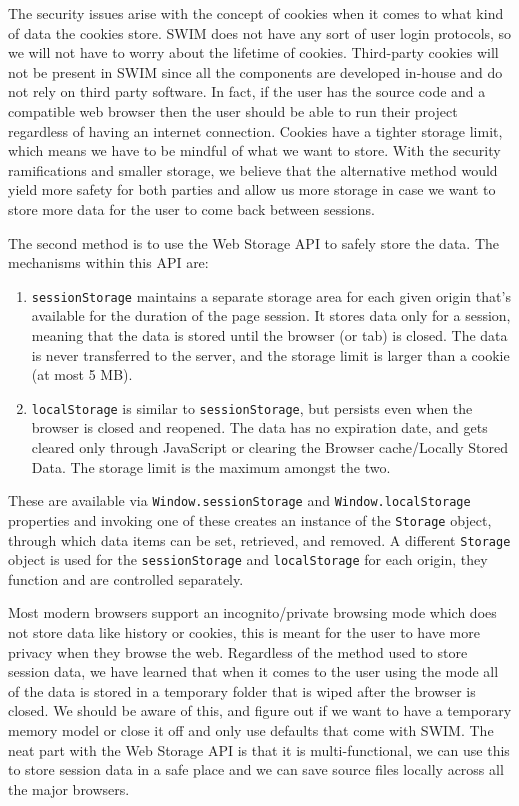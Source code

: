 \documentclass[
    paper=letter,
    parskip=half,
    fontsize=12pt,
    titlepage=firstiscover,
    toc=bibliography,
    numbers=endperiod
]{scrartcl}
\providecommand{\tightlist}{%
  \setlength{\itemsep}{0pt}\setlength{\parskip}{0pt}}
\begin{document}
The security issues arise with the concept of cookies when it comes to
what kind of data the cookies store. SWIM does not have any sort of user
login protocols, so we will not have to worry about the lifetime of
cookies. Third-party cookies will not be present in SWIM since all the
components are developed in-house and do not rely on third party
software. In fact, if the user has the source code and a compatible web
browser then the user should be able to run their project regardless of
having an internet connection.
Cookies have a tighter storage limit, which means we have to be mindful
of what we want to store. With the security ramifications and smaller
storage, we believe that the alternative method would yield more safety
for both parties and allow us more storage in case we want to store more
data for the user to come back between sessions.

The second method is to use the Web Storage API to safely store the
data. The mechanisms within this API are:

\begin{enumerate}
    \tightlist
    \item \texttt{sessionStorage} maintains a separate storage area for each
          given origin that's available for the duration of the page session. It
          stores data only for a session, meaning that the data is stored until
          the browser (or tab) is closed. The data is never transferred to the
          server, and the storage limit is larger than a cookie (at most 5 MB).
    \item \texttt{localStorage} is similar to \texttt{sessionStorage}, but persists even
          when the browser is closed and reopened. The data has no expiration
          date, and gets cleared only through JavaScript or clearing the Browser
          cache/Locally Stored Data. The storage limit is the maximum amongst
          the two.
\end{enumerate}

These are available via \texttt{Window.sessionStorage} and
\texttt{Window.localStorage} properties and invoking one of these
creates an instance of the \texttt{Storage} object, through which data
items can be set, retrieved, and removed. A different \texttt{Storage}
object is used for the \texttt{sessionStorage} and \texttt{localStorage}
for each origin, they function and are controlled separately.

Most modern browsers support an incognito/private browsing mode which
does not store data like history or cookies, this is meant for the user
to have more privacy when they browse the web. Regardless of the method
used to store session data, we have learned that when it comes to the
user using the mode all of the data is stored in a temporary folder that
is wiped after the browser is closed. We should be aware of this, and
figure out if we want to have a temporary memory model or close it off
and only use defaults that come with SWIM. The neat part with the Web
Storage API is that it is multi-functional, we can use this to store
session data in a safe place and we can save source files locally across
all the major browsers.
\end{document}
